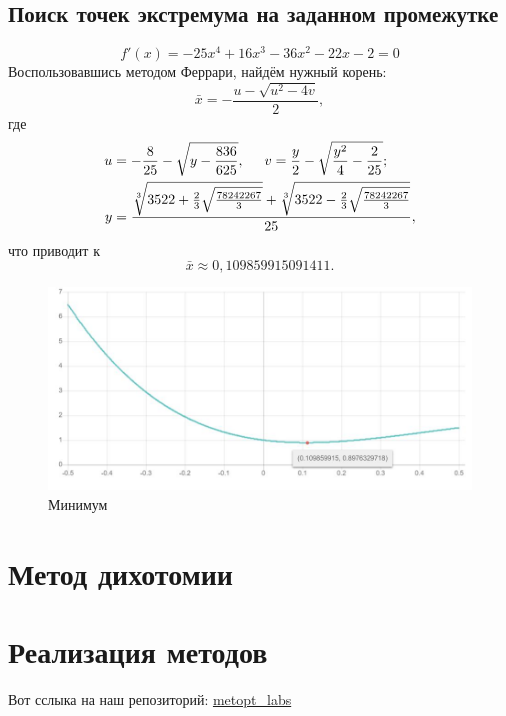 \subsection{Поиск точек экстремума на заданном промежутке}
\begin{equation*}
    f'(x) = -25x^4+16x^3-36x^2-22x-2 = 0
\end{equation*}
Воспользовавшись методом Феррари, найдём нужный корень:
\begin{equation*}
    \bar x = -\frac{u - \sqrt{u^2-4v}}{2},
\end{equation*}
где 
\begin{align*}
    u &= -\frac{8}{25}-\sqrt{y-\frac{836}{625}},
    \hspace{5 mm}
     v = \frac{y}{2}-\sqrt{\frac{y^2}{4}-\frac{2}{25}}; \\
    y &= \frac{\sqrt[3]{3522+\frac{2}{3}\sqrt{\frac{78242267}{3}}}+\sqrt[3]{3522-\frac{2}{3}\sqrt{\frac{78242267}{3}}}}{25},
\end{align*}
что приводит к
\begin{equation*}
    \bar x \approx 0,109859915091411.
\end{equation*}


\begin{figure}
\centering
\includegraphics[scale=0.4]{figures/chart02}
\caption{Минимум}
\label{fig:universe}
\end{figure}


\section{Метод дихотомии}



\section{Реализация методов}
Вот сслыка на наш репозиторий:  \href{https://github.com/ddd127/metopt_labs}{metopt\_labs}



